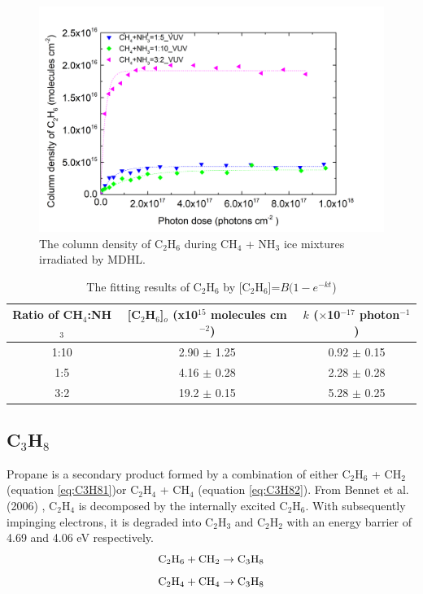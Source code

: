 \begin{figure}
\centering
\includegraphics[width=\textwidth]{figures/chapter3/C2H6_rate_VUV.png}
\caption{The column density of C$_2$H$_6$ during CH$_4$ + NH$_3$ ice mixtures irradiated by MDHL. }
\label{fig:lab_C2H6}
\end{figure}

\begin{table}[htbp]
\caption{The fitting results of C$_2$H$_6$ by [C$_2$H$_6$]=$B(1 - e^{-kt}$)}
\label{tab:fittingC2H6}
\begin{tabular}{ccc}
\hline
\hline
Ratio of CH$_4$:NH$_3$ & [C$_2$H$_6$]$_o$ (x10$^{15}$ molecules cm$^{-2}$) & $k$ ($\times$10$^{-17}$ photon$^{-1}$) \\
\hline
1:10 & 2.90 $\pm$ 1.25 & 0.92 $\pm$ 0.15 \\
1:5 & 4.16 $\pm$ 0.28 & 2.28 $\pm$ 0.28 \\
3:2 & 19.2 $\pm$ 0.15 & 5.28 $\pm$ 0.25 \\
\hline
\end{tabular}
\end{table}


\subsection{C$_3$H$_8$}

Propane is a secondary product formed by a combination of either C$_2$H$_6$ + CH$_2$ (equation \ref{eq:C3H81})or C$_2$H$_4$ + CH$_4$ (equation \ref{eq:C3H82}). From Bennet et al. (2006) \cite{bennett2006laboratory}, C$_2$H$_4$ is decomposed by the internally excited C$_2$H$_6$. With subsequently impinging electrons, it is degraded into C$_2$H$_3$ and C$_2$H$_2$ with an energy barrier of 4.69 and 4.06 eV respectively.
\begin{equation}
\rm{C_2H_6 + CH_2 \rightarrow C_3H_8}
\label{eq:C3H81}
\end{equation}
\begin{equation}
\rm{C_2H_4 + CH_4 \rightarrow C_3H_8}
\label{eq:C3H82}
\end{equation}

